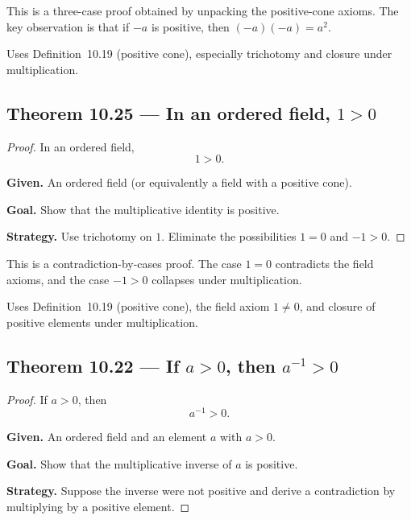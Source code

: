 \begin{remark*}
This is a three-case proof obtained by unpacking the positive-cone axioms.
The key observation is that if $-a$ is positive, then $(-a)(-a)=a^2$.
\end{remark*}

\begin{remark*}[Dependencies]
Uses Definition~10.19 (positive cone), especially trichotomy and closure under
multiplication.
\end{remark*}


\subsection*{Theorem 10.25 — In an ordered field, $1 > 0$}
\label{prf:grep-one-positive}

\begin{proof}
\Claim In an ordered field,
\[
1 > 0.
\]

\textbf{Given.} An ordered field (or equivalently a field with a positive cone).

\textbf{Goal.} Show that the multiplicative identity is positive.

\textbf{Strategy.} Use trichotomy on $1$.  Eliminate the possibilities $1=0$ and $-1>0$.


\end{proof}

\begin{remark*}
This is a contradiction-by-cases proof.  The case $1=0$ contradicts the field
axioms, and the case $-1>0$ collapses under multiplication.
\end{remark*}

\begin{remark*}[Dependencies]
Uses Definition~10.19 (positive cone), the field axiom $1 \neq 0$, and closure
of positive elements under multiplication.
\end{remark*}


\subsection*{Theorem 10.22 — If $a>0$, then $a^{-1}>0$}
\label{prf:grep-positive-inverse}

\begin{proof}
\Claim If $a>0$, then
\[
a^{-1} > 0.
\]

\textbf{Given.} An ordered field and an element $a$ with $a>0$.

\textbf{Goal.} Show that the multiplicative inverse of $a$ is positive.

\textbf{Strategy.} Suppose the inverse were not positive and derive a contradiction by multiplying by a positive element.


\end{proof}

